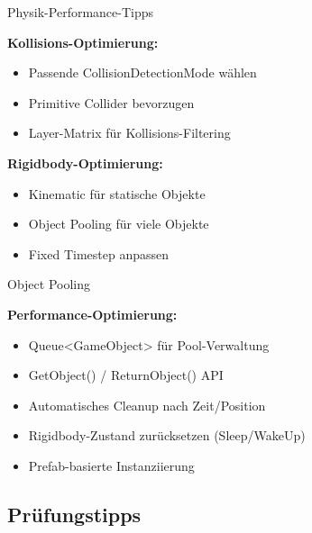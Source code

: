 
\begin{concept}{Physik-Performance-Tipps}

    \textbf{Kollisions-Optimierung:}
    \begin{itemize}
        \item Passende CollisionDetectionMode wählen
        \item Primitive Collider bevorzugen
        \item Layer-Matrix für Kollisions-Filtering
    \end{itemize}
    
    \textbf{Rigidbody-Optimierung:}
    \begin{itemize}
        \item Kinematic für statische Objekte
        \item Object Pooling für viele Objekte
        \item Fixed Timestep anpassen
    \end{itemize}
\end{concept}

\begin{concept}{Object Pooling}

    \textbf{Performance-Optimierung:}
    \begin{itemize}
        \item Queue<GameObject> für Pool-Verwaltung
        \item GetObject() / ReturnObject() API
        \item Automatisches Cleanup nach Zeit/Position
        \item Rigidbody-Zustand zurücksetzen (Sleep/WakeUp)
        \item Prefab-basierte Instanziierung
    \end{itemize}
\end{concept}

\multend

\raggedcolumns
\columnbreak

\subsection{Prüfungstipps}

